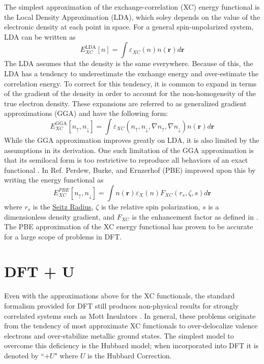 \documentclass[12pt]{article}
\begin{document}
The simplest approximation of the exchange-correlation (XC) energy functional is the Local Density Approximation (LDA), which soley depends on the value of the electronic density at each point in space. For a general spin-unpolarized system, LDA can be written as 
\begin{equation*}
    E_{XC}^{\mathrm{LDA}}[n] = \int \varepsilon_{XC}(n)n(\textbf{r})d\textbf{r}
\end{equation*}
The LDA assumes that the density is the same everywhere. Because of this, the LDA has a tendency to underestimate the exchange energy and over-estimate the correlation energy. To correct for this tendency, it is common to expand in terms of the gradient of the density in order to account for the non-homogeneity of the true electron density. These expansions are referred to as generalized gradient approximations (GGA) and have the following form:
\begin{equation*}\label{eq:GGAfunc}
    E_{XC}^{\mathrm{GGA}}[n_{\uparrow},n_{\downarrow}] = \int \varepsilon_{XC}(n_{\uparrow},n_{\downarrow},\nabla n_{\uparrow},\nabla n_{\downarrow})n(\textbf{r})d\textbf{r}
\end{equation*}
While the GGA approximation improves greatly on LDA, it is also limited by the assumptions in its derivation. One such limitation of the GGA approximation is that its semilocal form is too restrictive to reproduce all behaviors of an exact functional \cite{PBE2}. In Ref. \cite{PBE} Perdew, Burke, and Ernzerhof (PBE) improved upon this by writing the energy functional as 
\begin{equation}\label{eq:PBEfunc}
    E^{PBE}_{XC}[n_{\uparrow},n_{\downarrow}] = \int n(\textbf{r})\varepsilon_X(n)F_{XC}(r_s,\zeta,s) d\textbf{r}
\end{equation}
where $r_s$ is the \href{https://en.wikipedia.org/wiki/Wigner\%E2\%80\%93Seitz_radius}{Seitz Radius}, $\zeta$ is the relative spin polarization, $s$ is a dimensionless density gradient, and $F_{XC}$ is the enhancement factor as defined in \cite{PBEfxc}. The PBE approximation of the XC energy functional has proven to be accurate for a large scope of problems in DFT.

\section{DFT + U} %

Even with the approximations above for the XC functionals, the standard formalism provided for DFT still produces non-physical results for strongly correlated systems such as Mott Insulators \cite{DFT+Ubook}. 
In general, these problems originate from the tendency of most approximate XC functionals to over-delocalize valence electrons and over-stabilize metallic ground states. The simplest model to overcome this deficiency is the Hubbard model; when incorporated into DFT it is denoted by ``$+U$" where $U$ is the Hubbard Correction.
\end{document}
